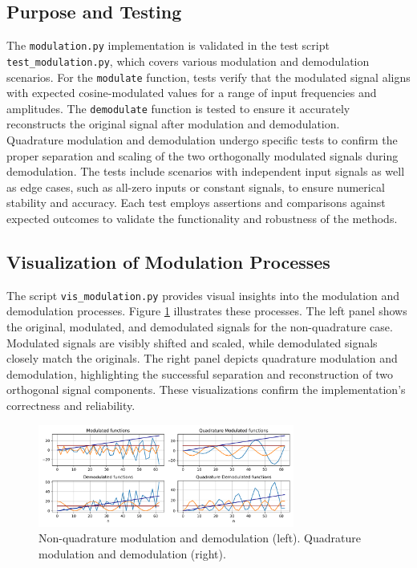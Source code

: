 \documentclass[12pt, a4paper]{report}
\begin{document}
\subsection{Purpose and Testing}
The \texttt{modulation.py} implementation is validated in the test script \texttt{test\_modulation.py}, which covers various modulation and demodulation scenarios. For the \texttt{modulate} function, tests verify that the modulated signal aligns with expected cosine-modulated values for a range of input frequencies and amplitudes. The \texttt{demodulate} function is tested to ensure it accurately reconstructs the original signal after modulation and demodulation.\\
Quadrature modulation and demodulation undergo specific tests to confirm the proper separation and scaling of the two orthogonally modulated signals during demodulation. The tests include scenarios with independent input signals as well as edge cases, such as all-zero inputs or constant signals, to ensure numerical stability and accuracy. Each test employs assertions and comparisons against expected outcomes to validate the functionality and robustness of the methods.

\subsection{Visualization of Modulation Processes}
The script \texttt{vis\_modulation.py} provides visual insights into the modulation and demodulation processes. Figure \ref{fig:modulation_visualizations} illustrates these processes. The left panel shows the original, modulated, and demodulated signals for the non-quadrature case. Modulated signals are visibly shifted and scaled, while demodulated signals closely match the originals. The right panel depicts quadrature modulation and demodulation, highlighting the successful separation and reconstruction of two orthogonal signal components. These visualizations confirm the implementation's correctness and reliability.

\begin{figure}[h!]
	\centering
	\includegraphics[width=0.75\textwidth]{figures/modulation.pdf}
	\caption{Non-quadrature modulation and demodulation (left). Quadrature modulation and demodulation (right).}
	\label{fig:modulation_visualizations}
\end{figure}
\end{document}
